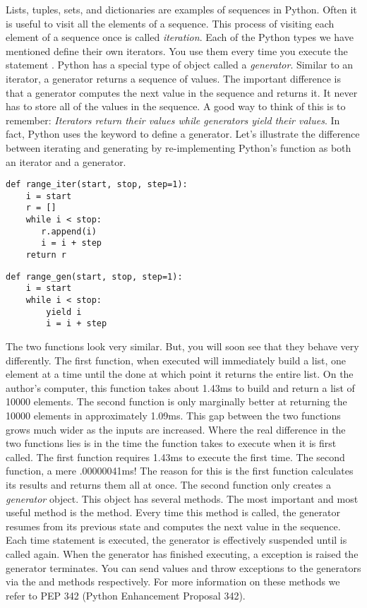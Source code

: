 \label{lab:Python_Generators}

Lists, tuples, sets, and dictionaries are examples of sequences in Python.
Often it is useful to visit all the elements of a sequence.  This process of visiting
each element of a sequence once is called \emph{iteration}. 
Each of the Python types we have mentioned define their own iterators.
You use them every time you execute the statement .
Python has a special type of object called a \emph{generator}.
Similar to an iterator, a generator returns a sequence of values.
The important difference is that a generator computes the next value in the sequence and returns it.
It never has to store all of the values in the sequence.
A good way to think of this is to remember: \emph{Iterators return their values while generators yield their values}.
In fact, Python uses the  keyword to define a generator.
Let's illustrate the difference between iterating and generating by re-implementing Python's  function
as both an iterator and a generator.
\begin{lstlisting}
def range_iter(start, stop, step=1):
    i = start
    r = []
    while i < stop:
       r.append(i)
       i = i + step
    return r
\end{lstlisting}
\begin{lstlisting}
def range_gen(start, stop, step=1):
    i = start
    while i < stop:
        yield i
        i = i + step
\end{lstlisting}
The two functions look very similar.  But, you will soon see that they behave very differently.
The first function, when executed will immediately build a list, one element at a time until the done
at which point it returns the entire list.  On the author's computer, this function takes about 1.43ms
to build and return a list of 10000 elements.  The second function is only marginally better at
returning the 10000 elements in approximately 1.09ms.  
This gap between the two functions grows much wider as the inputs are increased.
Where the real difference in the two functions lies is in the time the function takes to execute when
it is first called.  The first function requires 1.43ms to execute the first time.  The second function,
a mere .00000041ms!  The reason for this is the first function calculates its results and returns them all at once.  The second function only creates a \emph{generator} object.  This object has several methods.
The most important and most useful method is the  method.  Every time this method is called, 
the generator resumes from its previous state and computes the next value in the sequence. Each time  statement is executed, the generator is effectively suspended until  is called again.
When the generator has finished executing, a  exception is raised the generator terminates.
You can send values and throw exceptions to the generators via the  and  methods respectively.
For more information on these methods we refer to PEP 342 (Python Enhancement Proposal 342).

